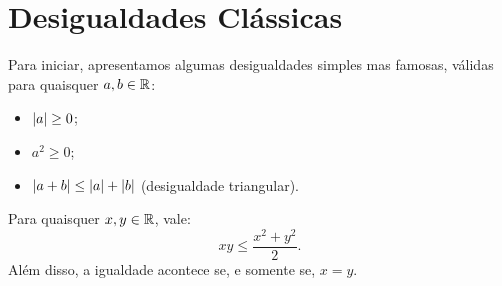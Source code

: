 \section{Desigualdades Clássicas}

Para iniciar, apresentamos algumas desigualdades simples mas famosas, válidas para quaisquer $a,b \in \mathbb{R}$:
\begin{itemize}
  \item $\left|a\right| \ge 0$;
  \item $a^2 \ge 0$;
  \item $\left|a+b\right| \le \left|a\right| + \left|b\right|$ (desigualdade triangular).
\end{itemize}

\begin{theorem}
Para quaisquer $x, y \in \mathbb{R}$, vale:
%
\begin{equation}
    xy \le \frac {x^2 +y^2} 2.
\end{equation}
%
Além disso, a igualdade acontece se, e somente se, $x=y$.
\end{theorem}
